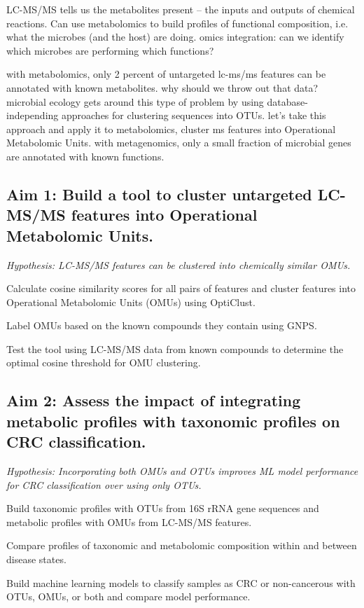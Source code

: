 \documentclass[11pt]{article}
\begin{document}
LC-MS/MS tells us the metabolites present -- the inputs and outputs of chemical reactions.
Can use metabolomics to build profiles of functional composition, i.e. what the microbes (and the host) are doing.
omics integration: can we identify which microbes are performing which functions?

with metabolomics, only 2 percent of untargeted lc-ms/ms features can be annotated with known metabolites.
why should we throw out that data?
microbial ecology gets around this type of problem by using database-independing approaches for clustering sequences into OTUs.
let's take this approach and apply it to metabolomics, cluster ms features into Operational Metabolomic Units.
with metagenomics, only a small fraction of microbial genes are annotated with known functions.

\subsection*{Aim 1: Build a tool to cluster untargeted LC-MS/MS features into Operational Metabolomic Units.}
\textit{Hypothesis: LC-MS/MS features can be clustered into chemically similar OMUs.}

\begin{compactenum}[A.]
    \item Calculate cosine similarity scores for all pairs of features and cluster features into Operational Metabolomic Units (OMUs) using OptiClust.
    \item Label OMUs based on the known compounds they contain using GNPS.
    \item Test the tool using LC-MS/MS data from known compounds to determine the optimal cosine threshold for OMU clustering.
\end{compactenum}

\subsection*{Aim 2: Assess the impact of integrating metabolic profiles with taxonomic profiles on CRC classification.}
\textit{Hypothesis: Incorporating both OMUs and OTUs improves ML model performance for CRC classification over using only OTUs.}

\begin{compactenum}[A.]
    \item Build taxonomic profiles with OTUs from 16S rRNA gene sequences and
    metabolic profiles with OMUs from LC-MS/MS features.
    \item Compare profiles of taxonomic and metabolomic composition within and between disease states.
    \item Build machine learning models to classify samples as CRC or non-cancerous with OTUs, OMUs, or both and compare model performance.
\end{compactenum}
\end{document}
